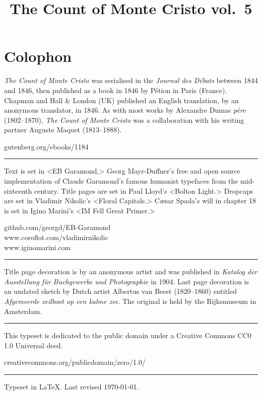 \documentclass[
a5paper,
]{scrbook}
\title{The Count of Monte Cristo vol.~5}
\begin{document}
\frontmatter

\tableofcontents
 

 
\mainmatter
\pagestyle{headings}
\setcounter{chapter}{95}























\cleardoublepage
{}
\chapter*{Colophon}
\vfill
\centering
\begin{minipage}{\textwidth}
\textit{The Count of Monte Cristo} was serialised in the \textit{Journal des Débats} between 1844 and 1846, then published as a book in 1846 by Pétion in Paris (France). Chapman and Hall \& London (UK) published an English translation, by an anonymous translator, in 1846. As with most works by Alexandre Dumas \textit{père} (1802--1870), \textit{The Count of Monte Cristo} was a collaboration with his writing partner Auguste Maquet (1813--1888).
\end{minipage}
\vfill
gutenberg.org/ebooks/1184
\vfill
\rule{0.5\textwidth}{.4pt}
\vfill
\begin{minipage}{\textwidth}
Text is set in <EB Garamond,> Georg Mayr-Duffner's free and open source implementation of Claude Garamond’s famous humanist typefaces from the mid-sixteenth century. Title pages are set in Paul Lloyd's <Bolton Light.> Dropcaps are set in Vladimir Nikolic's <Floral Capitals.> Cæsar Spada's will in chapter 18 is set in Igino Marini's <IM Fell Great Primer.>
\end{minipage}
\vfill
github.com/georgd/EB-Garamond\\www.coroflot.com/vladimirnikolic\\www.iginomarini.com
\vfill
\rule{0.5\textwidth}{.4pt}
\vfill
\begin{minipage}{\textwidth}
Title page decoration is by an anonymous artist and was published in \textit{Katalog der Ausstellung für Buchgewerbe und Photographie} in 1904. Last page decoration is an undated sketch by Dutch artist Albertus van Beest (1820--1860) entitled \textit{Afgemeerde zeilboot op een kalme zee}. The original is held by the Rijksmuseum in Amsterdam.
\end{minipage}
\vfill
\rule{0.5\textwidth}{.4pt}
\vfill
\begin{minipage}{\textwidth}
This typeset is dedicated to the public domain under a Creative Commons CC0 1.0 Universal deed.
\end{minipage}
\vfill
creativecommons.org/publicdomain/zero/1.0/
\vfill
\rule{0.5\textwidth}{.4pt}
\vfill
Typeset in \LaTeX{}. Last revised \today.
\thispagestyle{empty}
\end{document}
